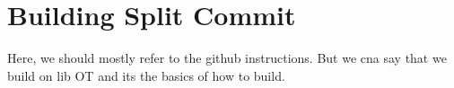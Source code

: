 \section{Building Split Commit}

Here, we should mostly refer to the github instructions. But we cna say that we  build on lib OT and its the basics of how to build.